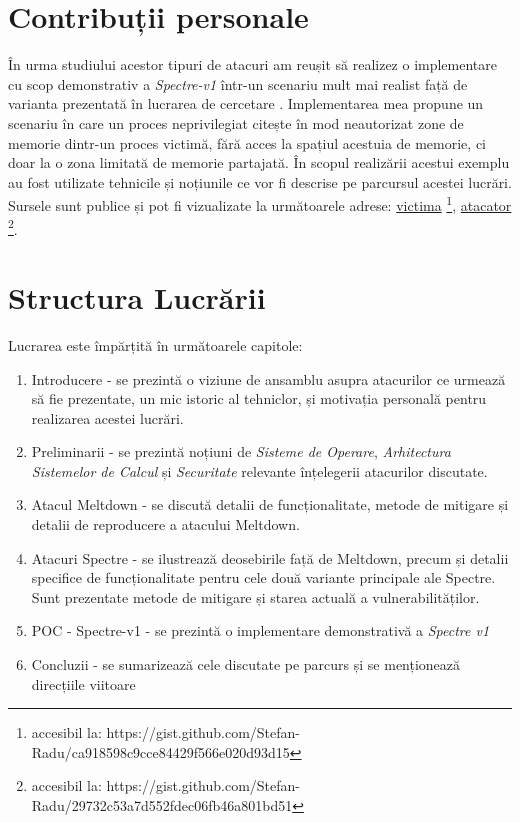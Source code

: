 \section{Contribuții personale}

În urma studiului acestor tipuri de atacuri am reușit să realizez o
implementare cu scop demonstrativ a \emph{Spectre-v1} într-un scenariu mult mai
realist față de varianta prezentată în lucrarea de cercetare
\cite{spectre2019}. Implementarea mea propune un scenariu în care un proces
neprivilegiat citește în mod neautorizat zone de memorie dintr-un proces
victimă, fără acces la spațiul acestuia de memorie, ci doar la o zona limitată
de memorie partajată. În scopul realizării acestui exemplu au fost utilizate
tehnicile și noțiunile ce vor fi descrise pe parcursul acestei lucrări. Sursele sunt
publice și pot fi vizualizate la următoarele adrese:
\href{https://gist.github.com/Stefan-Radu/ca918598c9cce84429f566e020d93d15}{victima}
\footnote[1]{accesibil la: https://gist.github.com/Stefan-Radu/ca918598c9cce84429f566e020d93d15},
\href{https://gist.github.com/Stefan-Radu/29732c53a7d552fdec06fb46a801bd51}{atacator}
\footnote[2]{accesibil la: https://gist.github.com/Stefan-Radu/29732c53a7d552fdec06fb46a801bd51}.

\section{Structura Lucrării}

Lucrarea este împărțită în următoarele capitole:

\begin{enumerate}
  \item Introducere - se prezintă o viziune de ansamblu asupra atacurilor ce
    urmează să fie prezentate, un mic istoric al tehniclor, și motivația
    personală pentru realizarea acestei lucrări.
  \item Preliminarii - se prezintă noțiuni de \emph{Sisteme de Operare},
    \emph{Arhitectura Sistemelor de Calcul} și \emph{Securitate} relevante
    înțelegerii atacurilor discutate.
  \item Atacul Meltdown - se discută detalii de funcționalitate, metode de
    mitigare și detalii de reproducere a atacului Meltdown.
  \item Atacuri Spectre - se ilustrează deosebirile față de Meltdown, precum și
    detalii specifice de funcționalitate pentru cele două variante principale
    ale Spectre. Sunt prezentate metode de mitigare și starea actuală a
    vulnerabilităților.
  \item POC - Spectre-v1 - se prezintă o implementare demonstrativă a
    \emph{Spectre v1}
  \item Concluzii - se sumarizează cele discutate pe parcurs și se menționează
    direcțiile viitoare
\end{enumerate}

